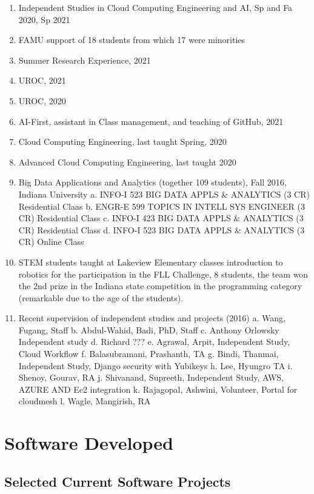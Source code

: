 \documentclass{article}
\begin{document}
\begin{enumerate}
\item  Independent Studies in Cloud Computing Engineering and AI, Sp and Fa 2020, Sp 2021
\item  FAMU support of 18 students from which 17 were minorities
\item  Summer Research Experience, 2021
\item  UROC, 2021
\item  UROC, 2020
\item  AI-First, assistant in Class management, and teaching of GitHub, 2021
\item  Cloud Computing Engineering, last taught Spring, 2020
\item  Advanced Cloud Computing Engineering, last taught 2020
\item  Big Data Applications and Analytics (together 109 students), Fall 2016, Indiana University
        a. INFO-I 523  BIG DATA APPLS \& ANALYTICS (3 CR) Residential Claas
        b. ENGR-E 599  TOPICS IN INTELL SYS ENGINEER (3 CR) Residential Class
        c. INFO-I 423  BIG DATA APPLS \& ANALYTICS (3 CR) Residential Class
        d.  INFO-I 523  BIG DATA APPLS \& ANALYTICS (3 CR) Online Class
\item  STEM students taught at Lakeview Elementary classes introduction to robotics for the participation in the FLL Challenge, 8 students, the team won the 2nd prize in the Indiana state competition in the programming category (remarkable due to the age of the students).
\item  Recent supervision of independent studies and projects (2016)
        a. Wang, Fugang, Staff
        b. Abdul-Wahid, Badi, PhD, Staff
        c. Anthony Orlowsky Independent study
        d. Richard ???
        e. Agrawal, Arpit, Independent Study, Cloud Workflow
        f. Balasubramani, Prashanth, TA
        g. Bindi, Thanmai,  Independent Study, Django security with Yubikeys
        h. Lee, Hyungro TA
        i. Shenoy, Gourav, RA
        j. Shivanand, Supreeth,  Independent Study, AWS, AZURE AND Ec2 integration
        k. Rajagopal, Ashwini, Volunteer, Portal for cloudmesh
        l. Wagle, Mangirish, RA
\end{enumerate}

\section{Software Developed}

\subsection{Selected Current Software Projects}
\end{document}
